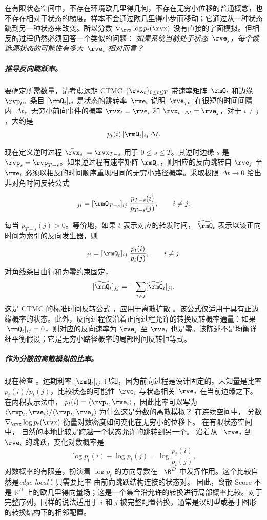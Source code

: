 在有限状态空间中，不存在环境欧几里得几何，不存在无穷小位移的普通概念，也不存在相对于状态的梯度。样本不会通过欧几里得小步而移动；它通过从一种状态跳到另一种状态来改变。所以分数 $\nabla_{\rvx}\log p_t(\rvx)$ 没有直接的字面模拟。但相反的过程仍然必须回答一个类似的问题： \emph{如果系统当前处于状态~$\rve_j$，每个候选源状态的可能性有多大~$\rve_i$ 相对而言？}

\subparagraph{推导反向跳跃率。}
要确定所需数量，请考虑远期 CTMC $\{\rvx_t\}_{0\leq t\leq T}$ 带速率矩阵~$\rmQ_t$ 和边缘 $\rvp_t$。条目 $[\rmQ_t]_{ij}$ 是状态的跳转率~$\rve_i$ 说明~$\rve_j$。在很短的时间间隔内~$\Delta t$，无穷小前向事件的概率
$\rvx_t=\rve_i$ 和 $\rvx_{t+\Delta t}=\rve_j$，对于 $i\neq j$，大约是
\[
p_t(i)\,[\rmQ_t]_{ij}\,\Delta t.
\]

现在定义逆时过程 $\bar{\rvx}_s := \rvx_{T-s}$ 用于 $0\leq s\leq T$。其逆时边缘 $s$ 是 $\bar{\rvp}_s=\rvp_{T-s}$。如果逆过程有速率矩阵 $\bar{\rmQ}_s$，则相应的反向跳转自 $\rve_j$ 至 $\rve_i$ 必须以相反的时间顺序重现相同的无穷小路径概率。采取极限 $\Delta t\to 0$ 给出非对角时间反转公式
\begin{mdframed}
\begin{equation}
[\bar{\rmQ}_s]_{ji}
= [\rmQ_{T-s}]_{ij}\;\frac{p_{T-s}(i)}{p_{T-s}(j)},
\qquad i \neq j,
\label{eq:reverse-rate-discrete-reverse-time}
\end{equation}
\end{mdframed}
每当 $p_{T-s}(j)>0$。等价地，如果 $t$ 表示对应的转发时间， $\widetilde{\rmQ}_t$ 表示以该正向时间为索引的反向发生器，则
\begin{equation}
[\widetilde{\rmQ}_t]_{ji}
= [\rmQ_t]_{ij}\;\frac{p_t(i)}{p_t(j)},
\qquad i \neq j.
\label{eq:reverse-rate-discrete}
\end{equation}
对角线条目由行和为零约束固定，
\[
[\widetilde{\rmQ}_t]_{jj}
=
-\sum_{i\neq j}[\widetilde{\rmQ}_t]_{ji}.
\]
这是 CTMC 的标准时间反转公式
\citep{kelly1979reversibility,anderson2012continuous}，应用于离散扩散 \citet{campbell2022continuous}。该公式仅适用于具有正边缘概率的状态。此外，反向过程仅沿着正向过程允许的转换反转概率通量：如果 $[\rmQ_t]_{ij}=0$，则对应的反向速率为
$\rve_j$ 至 $\rve_i$ 也是零。该陈述不是均衡详细平衡假设；它是无穷小路径概率的局部时间反转恒等式。

\subparagraph{作为分数的离散模拟的比率。}
现在检查 。远期利率
$[\rmQ_t]_{ij}$ 已知，因为前向过程是设计固定的。未知量是比率 $p_t(i)/p_t(j)$，比较状态的可能性~$\rve_i$ 与状态相关~$\rve_j$ 在当前边缘之下。在内积表示法中，
$p_t(i) = \langle\rvp_t,\rve_i\rangle$，因此比率可以写为
$\langle\rvp_t,\rve_i\rangle / \langle\rvp_t,\rve_j\rangle$.为什么这是分数的离散模拟？  在连续空间中，
分数 $\nabla_{\rvx}\log p_t(\rvx)$ 衡量对数密度如何变化在无穷小的位移下。  在有限状态空间中，
自然的本地比较是跨越一个状态允许的跳转到另一个。  沿着从 ~$\rve_j$ 到 ~$\rve_i$ 的跳跃，变化对数概率是
\[
\log p_t(i) - \log p_t(j)
= \log \frac{p_t(i)}{p_t(j)},
\]
对数概率的有限差，扮演着
$\log p_t$ 的方向导数在 ~$\R^D$ 中发挥作用。这个比较自然是\emph{edge-local}：只需要比率
由前向跳跃结构连接的状态对。  因此，离散
Score 不是 $\mathbb{R}^D$ 上的欧几里得向量场；这是一个集合沿允许的转换进行局部概率比较。对于完整序列，同样的说法适用于 $i$ 和 $j$ 被完整配置替换，通常是汉明型或基于图形的转换结构下的相邻配置。

